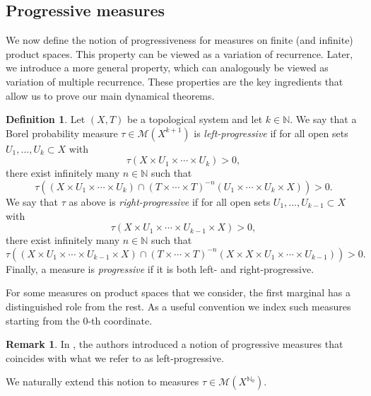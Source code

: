 \documentclass[letter, 11pt]{article}
\theoremstyle{definition}
\newtheorem{defn}[theo]{Definition}
\newtheorem*{remark*}{Remark}
\theoremstyle{plain}
\newcommand{\N}{\mathbb{N}}
\newcommand{\cM}{\mathcal{M}}
\newcommand{\1}{\mathbbm{1}}
\begin{document}
\subsection{Progressive measures}

We now define the notion of progressiveness for measures on 
finite (and infinite) product spaces. This property can be 
viewed as a variation of recurrence. Later, we   introduce a more general property, which can analogously be viewed 
as variation of multiple recurrence. These properties are the key ingredients that allow us to prove our main dynamical theorems.

\begin{defn} \label{definition left-right progressive measure}
    Let $(X,T)$ be a topological system and let $k\in \N$. We say that a Borel probability measure $\tau \in \cM (X^{k+1})$ is \emph{left-progressive} if for all open sets $U_1, \ldots , U_k \subset X$ with 
    $$ \tau(X \times U_1 \times \cdots \times U_k) >0,$$
there exist infinitely many $n \in \N$ such that
\begin{equation*} 
    \tau((X \times U_1 \times \cdots \times U_k) \cap (T \times  \cdots \times T)^{-n} (U_1 \times \cdots \times U_k \times X)) >0.
\end{equation*}
We say that $\tau$ as above is \emph{right-progressive} if for all open sets $U_1, \ldots , U_{k-1} \subset X$ with 
$$\tau(X \times U_1 \times \cdots \times U_{k-1} \times X) >0,$$ 
there exist infinitely many $n \in \N$ such that
\begin{equation*} 
    \tau((X \times U_1 \times \cdots \times U_{k-1} \times X) \cap (T \times  \cdots \times T)^{-n} (X \times X \times U_1 \times \cdots \times U_{k-1})) >0.
\end{equation*}
Finally, a measure is \emph{progressive} if it is both left- and right-progressive. 
\end{defn}

For some measures on product spaces that we   consider, 
the first marginal has a distinguished role from the rest. 
As a useful convention we   index such measures starting 
from the $0$-th coordinate. 

\begin{remark*}
    In \cite[Definition 3.1]{kmrr25}, the authors introduced a notion of progressive measures that coincides with what we refer to as left-progressive.
\end{remark*}

We naturally extend this notion to measures $\tau \in \cM(X^{\N_0})$.
\end{document}
